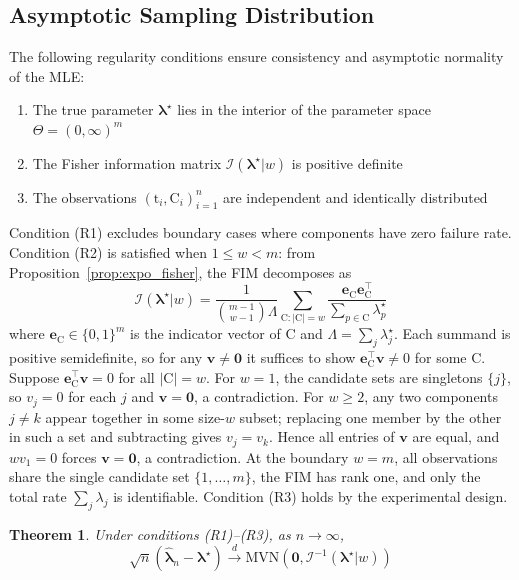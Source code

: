 \documentclass[pdflatex,sn-mathphys-num,Numbered]{sn-jnl}
\newcommand{\RV}[1]{\mathrm{#1}}
\newcommand{\cand}{\RV{C}}         %
\newcommand{\ti}{\mathrm{t}}       %
\newcommand{\tparam}[1]{{#1}^{\star}}  %
\newcommand{\expomle}{\boldsymbol{\hat{\lambda}}_n}
\newcommand{\infomatrx}{\mathcal{I}}
\newcommand{\mvn}{\mathrm{MVN}}
\renewcommand{\vec}[1]{\boldsymbol{#1}}
\theoremstyle{thmstyleone}
\newtheorem{theorem}{Theorem}[section]
\theoremstyle{thmstylethree}
\theoremstyle{thmstyletwo}
\begin{document}
\subsection{Asymptotic Sampling Distribution}

The following regularity conditions ensure consistency and asymptotic normality of the MLE:
\begin{enumerate}
\item[(R1)] The true parameter $\tparam{\vec{\lambda}}$ lies in the interior of the parameter space $\Theta = (0,\infty)^m$
\item[(R2)] The Fisher information matrix $\infomatrx(\tparam{\vec{\lambda}} | w)$ is positive definite
\item[(R3)] The observations $(\ti_i, \cand_i)_{i=1}^n$ are independent and identically distributed
\end{enumerate}

Condition (R1) excludes boundary cases where components have zero failure rate. Condition (R2) is satisfied when $1 \leq w < m$: from Proposition~\ref{prop:expo_fisher}, the FIM decomposes as
\begin{equation}
\infomatrx(\tparam{\vec{\lambda}} | w) = \frac{1}{\binom{m-1}{w-1}\Lambda} \sum_{\cand: |\cand|=w} \frac{\vec{e}_{\cand}\vec{e}_{\cand}^\top}{\sum_{p \in \cand} \tparam{\lambda}_p}
\end{equation}
where $\vec{e}_{\cand} \in \{0,1\}^m$ is the indicator vector of $\cand$ and $\Lambda = \sum_j \tparam{\lambda}_j$. Each summand is positive semidefinite, so for any $\vec{v} \neq \vec{0}$ it suffices to show $\vec{e}_{\cand}^\top \vec{v} \neq 0$ for some $\cand$. Suppose $\vec{e}_{\cand}^\top \vec{v} = 0$ for all $|\cand| = w$. For $w = 1$, the candidate sets are singletons $\{j\}$, so $v_j = 0$ for each $j$ and $\vec{v} = \vec{0}$, a contradiction. For $w \geq 2$, any two components $j \neq k$ appear together in some size-$w$ subset; replacing one member by the other in such a set and subtracting gives $v_j = v_k$. Hence all entries of $\vec{v}$ are equal, and $w v_1 = 0$ forces $\vec{v} = \vec{0}$, a contradiction. At the boundary $w = m$, all observations share the single candidate set $\{1,\ldots,m\}$, the FIM has rank one, and only the total rate $\sum_j \lambda_j$ is identifiable. Condition (R3) holds by the experimental design.

\begin{theorem}
\label{thm:asymptotic_normal}
Under conditions (R1)--(R3), as $n \to \infty$,
\begin{equation}
\sqrt{n}(\expomle - \tparam{\vec{\lambda}}) \xrightarrow{d} \mvn\left(\vec{0}, \infomatrx^{-1}(\tparam{\vec{\lambda}} | w)\right)
\end{equation}
\end{theorem}
\end{document}
